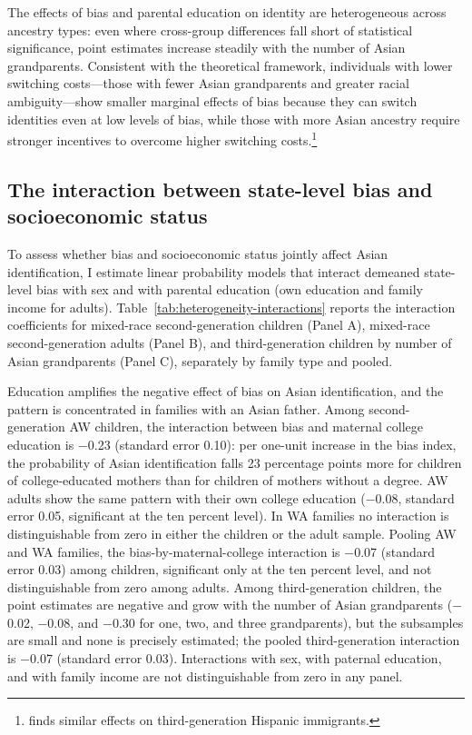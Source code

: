 The effects of bias and parental education on identity are heterogeneous across ancestry types: even where cross-group differences fall short of statistical significance, point estimates increase steadily with the number of Asian grandparents. Consistent with the theoretical framework, individuals with lower switching costs---those with fewer Asian grandparents and greater racial ambiguity---show smaller marginal effects of bias because they can switch identities even at low levels of bias, while those with more Asian ancestry require stronger incentives to overcome higher switching costs.\footnote{\textcite{hadah2024hispanicidentity} finds similar effects on third-generation Hispanic immigrants.}

\subsection*{The interaction between state-level bias and socioeconomic status}

To assess whether bias and socioeconomic status jointly affect Asian identification, I estimate linear probability models that interact demeaned state-level bias with sex and with parental education (own education and family income for adults). Table~\ref{tab:heterogeneity-interactions} reports the interaction coefficients for mixed-race second-generation children (Panel A), mixed-race second-generation adults (Panel B), and third-generation children by number of Asian grandparents (Panel C), separately by family type and pooled.
 
Education amplifies the negative effect of bias on Asian identification, and the pattern is concentrated in families with an Asian father. Among second-generation AW children, the interaction between bias and maternal college education is $-$0.23 (standard error 0.10): per one-unit increase in the bias index, the probability of Asian identification falls 23 percentage points more for children of college-educated mothers than for children of mothers without a degree. AW adults show the same pattern with their own college education ($-$0.08, standard error 0.05, significant at the ten percent level). In WA families no interaction is distinguishable from zero in either the children or the adult sample. Pooling AW and WA families, the bias-by-maternal-college interaction is $-$0.07 (standard error 0.03) among children, significant only at the ten percent level, and not distinguishable from zero among adults. Among third-generation children, the point estimates are negative and grow with the number of Asian grandparents ($-$0.02, $-$0.08, and $-$0.30 for one, two, and three grandparents), but the subsamples are small and none is precisely estimated; the pooled third-generation interaction is $-$0.07 (standard error 0.03). Interactions with sex, with paternal education, and with family income are not distinguishable from zero in any panel.
 
